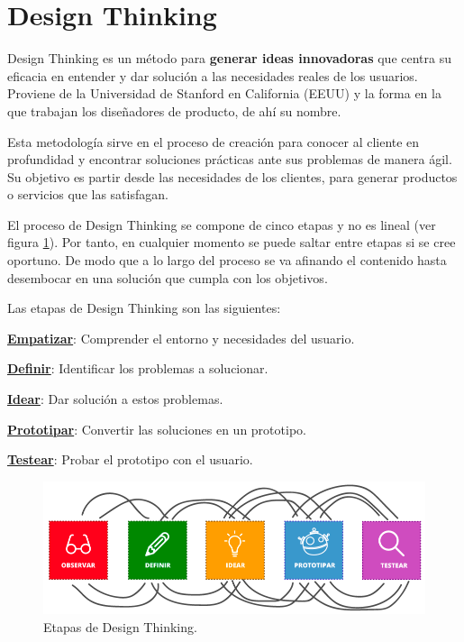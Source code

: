 \documentclass[12pt,twoside,titlepage]{report}
\begin{document}
\section{Design Thinking}
\label{sec:design}

Design Thinking es un método para \textbf{generar ideas innovadoras} que centra su eficacia en entender y dar solución a las necesidades reales de los usuarios. Proviene de la Universidad de Stanford en California (EEUU) y la forma en la que trabajan los diseñadores de producto, de ahí su nombre.
\cite{desingThinking1}

Esta metodología sirve en el proceso de creación para conocer al cliente en profundidad y encontrar soluciones prácticas ante sus problemas de manera ágil. Su objetivo es partir desde las necesidades de los clientes, para generar productos o servicios que las satisfagan.

El proceso de Design Thinking se compone de cinco etapas y no es lineal (ver figura \ref{fig:DesignThinking}). Por tanto, en cualquier momento se puede saltar entre etapas si se cree oportuno. De modo que a lo largo del proceso se va afinando el contenido hasta desembocar en una solución que cumpla con los objetivos. 
\cite{desingThinking2}

Las etapas de Design Thinking son las siguientes:
\begin{compactitem}
    \item \hyperref[sec:empatizar]{\textbf{Empatizar}}: Comprender el entorno y necesidades del usuario. 
    \item \hyperref[sec:definir]{\textbf{Definir}}: Identificar los problemas a solucionar. 
    \item \hyperref[sec:idear]{\textbf{Idear}}: Dar solución a estos problemas. 
    \item \hyperref[sec:prototipar]{\textbf{Prototipar}}: Convertir las soluciones en un prototipo. 
    \item \hyperref[sec:testear]{\textbf{Testear}}: Probar el prototipo con el usuario.
\end{compactitem}

\begin{figure}[H] 
    \includegraphics[scale=0.44]{Design Thinking/Etapas}
    \centering
    \caption{Etapas de Design Thinking.}
    \label{fig:DesignThinking}
\end{figure}
\end{document}
